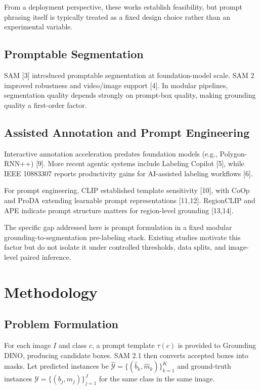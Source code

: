 \documentclass[pdflatex,sn-mathphys-num]{sn-jnl}
\begin{document}
From a deployment perspective, these works establish feasibility, but prompt phrasing itself is typically treated as a fixed design choice rather than an experimental variable.

\subsection{Promptable Segmentation}

SAM [3] introduced promptable segmentation at foundation-model scale. SAM 2 improved robustness and video/image support [4]. In modular pipelines, segmentation quality depends strongly on prompt-box quality, making grounding quality a first-order factor.

\subsection{Assisted Annotation and Prompt Engineering}

Interactive annotation acceleration predates foundation models (e.g., Polygon-RNN++) [9]. More recent agentic systems include Labeling Copilot [5], while IEEE 10883307 reports productivity gains for AI-assisted labeling workflows [6].

For prompt engineering, CLIP established template sensitivity [10], with CoOp and ProDA extending learnable prompt representations [11,12]. RegionCLIP and APE indicate prompt structure matters for region-level grounding [13,14].

The specific gap addressed here is prompt formulation in a fixed modular grounding-to-segmentation pre-labeling stack. Existing studies motivate this factor but do not isolate it under controlled thresholds, data splits, and image-level paired inference.

\section{Methodology}

\subsection{Problem Formulation}

For each image $I$ and class $c$, a prompt template $\tau(c)$ is provided to Grounding DINO, producing candidate boxes. SAM 2.1 then converts accepted boxes into masks. Let predicted instances be $\hat{\mathcal{Y}}=\{(\hat{b}_k,\hat{m}_k)\}_{k=1}^{K}$ and ground-truth instances $\mathcal{Y}=\{(b_j,m_j)\}_{j=1}^{J}$ for the same class in the same image.
\end{document}
